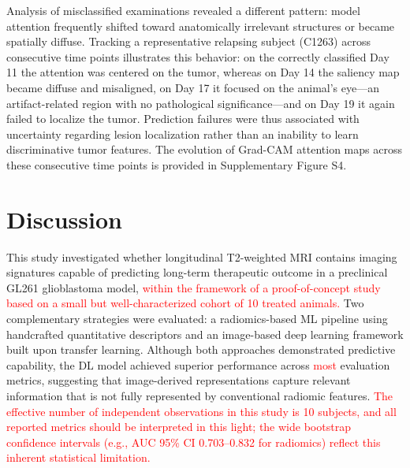 \documentclass{article}
\begin{document}
Analysis of misclassified examinations revealed a different pattern: model attention frequently shifted toward anatomically irrelevant structures or became spatially diffuse. Tracking a representative relapsing subject (C1263) across consecutive time points illustrates this behavior: on the correctly classified Day 11 the attention was centered on the tumor, whereas on Day 14 the saliency map became diffuse and misaligned, on Day 17 it focused on the animal's eye---an artifact-related region with no pathological significance---and on Day 19 it again failed to localize the tumor. Prediction failures were thus associated with uncertainty regarding lesion localization rather than an inability to learn discriminative tumor features. The evolution of Grad-CAM attention maps across these consecutive time points is provided in Supplementary Figure S4.


\section{Discussion}
This study investigated whether longitudinal T2-weighted MRI contains imaging signatures capable of predicting long-term therapeutic outcome in a preclinical GL261 glioblastoma model, \textcolor{red}{within the framework of a proof-of-concept study based on a small but well-characterized cohort of 10 treated animals.} Two complementary strategies were evaluated: a radiomics-based ML pipeline using handcrafted quantitative descriptors and an image-based deep learning framework built upon transfer learning. Although both approaches demonstrated predictive capability, the DL model achieved superior performance across \textcolor{red}{most} evaluation metrics, suggesting that image-derived representations capture relevant information that is not fully represented by conventional radiomic features. \textcolor{red}{The effective number of independent observations in this study is 10 subjects, and all reported metrics should be interpreted in this light; the wide bootstrap confidence intervals (e.g., AUC 95\% CI 0.703--0.832 for radiomics) reflect this inherent statistical limitation.}
\end{document}
